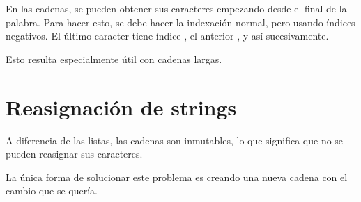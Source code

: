 En las cadenas, se pueden obtener sus caracteres empezando desde el final de la palabra.
Para hacer esto, se debe hacer la indexación normal, pero usando índices negativos.
El último caracter tiene índice , el anterior , y así sucesivamente.


Esto resulta especialmente útil con cadenas largas.

\section{Reasignación de strings}

A diferencia de las listas, las cadenas son inmutables, lo que significa que no se pueden reasignar sus caracteres.


La única forma de solucionar este problema es creando una nueva cadena con el cambio que se quería.


\clearpage